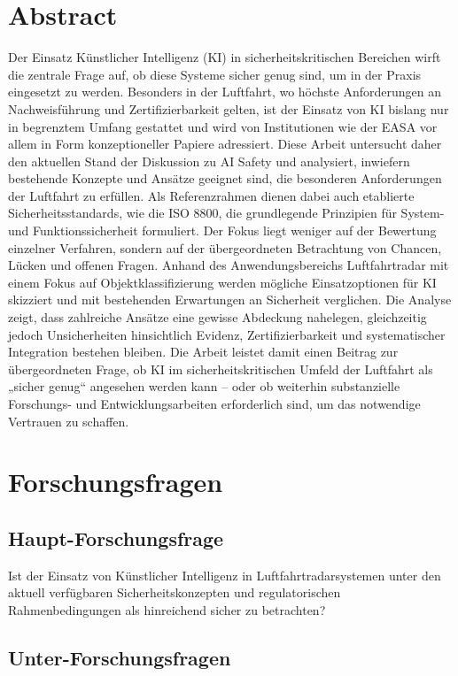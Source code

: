 \section{Abstract}
Der Einsatz Künstlicher Intelligenz (KI) in sicherheitskritischen Bereichen wirft die 
zentrale Frage auf, ob diese Systeme sicher genug sind, um in der Praxis eingesetzt zu 
werden. Besonders in der Luftfahrt, wo höchste Anforderungen an Nachweisführung und 
Zertifizierbarkeit gelten, ist der Einsatz von KI bislang nur in begrenztem Umfang 
gestattet und wird von Institutionen wie der EASA vor allem in Form konzeptioneller 
Papiere adressiert. Diese Arbeit untersucht daher den aktuellen Stand der Diskussion zu 
AI Safety und analysiert, inwiefern bestehende Konzepte und Ansätze geeignet sind, 
die besonderen Anforderungen der Luftfahrt zu erfüllen. Als Referenzrahmen dienen 
dabei auch etablierte Sicherheitsstandards, wie die ISO 8800, die grundlegende Prinzipien 
für System- und Funktionssicherheit formuliert. Der Fokus liegt weniger auf der Bewertung 
einzelner Verfahren, sondern auf der übergeordneten Betrachtung von Chancen, Lücken und 
offenen Fragen. Anhand des Anwendungsbereichs Luftfahrtradar mit einem Fokus auf Objektklassifizierung werden mögliche Einsatzoptionen 
für KI skizziert und mit bestehenden Erwartungen an Sicherheit verglichen. Die Analyse zeigt, 
dass zahlreiche Ansätze eine gewisse Abdeckung nahelegen, gleichzeitig jedoch Unsicherheiten 
hinsichtlich Evidenz, Zertifizierbarkeit und systematischer Integration bestehen bleiben. 
Die Arbeit leistet damit einen Beitrag zur übergeordneten Frage, ob KI im 
sicherheitskritischen Umfeld der Luftfahrt als „sicher genug“ angesehen werden kann – 
oder ob weiterhin substanzielle Forschungs- und Entwicklungsarbeiten erforderlich sind, 
um das notwendige Vertrauen zu schaffen.

\section{Forschungsfragen}
\subsection{Haupt-Forschungsfrage}
Ist der Einsatz von Künstlicher Intelligenz in Luftfahrtradarsystemen 
unter den aktuell verfügbaren Sicherheitskonzepten und regulatorischen Rahmenbedingungen 
als hinreichend sicher zu betrachten?

\subsection{Unter-Forschungsfragen}
